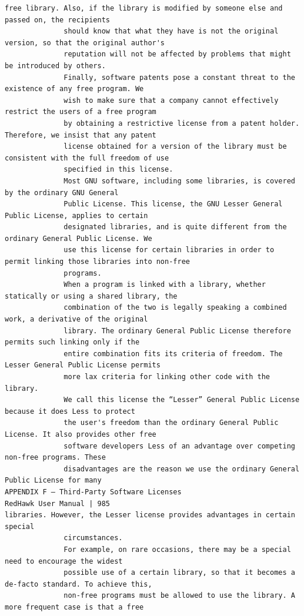 \begin{lstlisting}[basicstyle=\ttfamily\scriptsize,breaklines=true]
              free library. Also, if the library is modified by someone else and passed on, the recipients
              should know that what they have is not the original version, so that the original author's
              reputation will not be affected by problems that might be introduced by others.
              Finally, software patents pose a constant threat to the existence of any free program. We
              wish to make sure that a company cannot effectively restrict the users of a free program
              by obtaining a restrictive license from a patent holder. Therefore, we insist that any patent
              license obtained for a version of the library must be consistent with the full freedom of use
              specified in this license.
              Most GNU software, including some libraries, is covered by the ordinary GNU General
              Public License. This license, the GNU Lesser General Public License, applies to certain
              designated libraries, and is quite different from the ordinary General Public License. We
              use this license for certain libraries in order to permit linking those libraries into non-free
              programs.
              When a program is linked with a library, whether statically or using a shared library, the
              combination of the two is legally speaking a combined work, a derivative of the original
              library. The ordinary General Public License therefore permits such linking only if the
              entire combination fits its criteria of freedom. The Lesser General Public License permits
              more lax criteria for linking other code with the library.
              We call this license the “Lesser” General Public License because it does Less to protect
              the user's freedom than the ordinary General Public License. It also provides other free
              software developers Less of an advantage over competing non-free programs. These
              disadvantages are the reason we use the ordinary General Public License for many
APPENDIX F — Third-Party Software Licenses                                    RedHawk User Manual | 985
libraries. However, the Lesser license provides advantages in certain special
              circumstances.
              For example, on rare occasions, there may be a special need to encourage the widest
              possible use of a certain library, so that it becomes a de-facto standard. To achieve this,
              non-free programs must be allowed to use the library. A more frequent case is that a free

\end{lstlisting}
